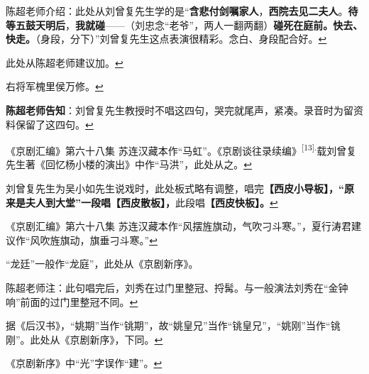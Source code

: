 \item
  \leavevmode\hypertarget{fn126}{}%
  陈超老师介绍：此处从刘曾复先生学的是``\textbf{含悲付剑嘱家人}，\textbf{西院去见二夫人}。\textbf{待等五鼓天明后}，\textbf{我就碰}------（刘忠念``老爷''，两人一翻两翻）\textbf{碰死在庭前。快去、快走。}（身段，分下）''刘曾复先生这点表演很精彩。念白、身段配合好。\protect\hyperlink{fnref126}{↩}
\item
  \leavevmode\hypertarget{fn127}{}%
  此处从陈超老师建议加。\protect\hyperlink{fnref127}{↩}
\item
  \leavevmode\hypertarget{fn128}{}%
  右将军槐里侯万修。\protect\hyperlink{fnref128}{↩}
\item
  \leavevmode\hypertarget{fn129}{}%
  \textbf{陈超老师告知}：刘曾复先生教授时不唱这四句，哭完就尾声，紧凑。录音时为留资料保留了这四句。\protect\hyperlink{fnref129}{↩}
\item
  \leavevmode\hypertarget{fn130}{}%
  《京剧汇编》第六十八集
  苏连汉藏本作``马虹''。《京剧谈往录续编》\textsuperscript{{[}13{]}.}载刘曾复先生著《回忆杨小楼的演出》中作``马洪''，此处从之。\protect\hyperlink{fnref130}{↩}
\item
  \leavevmode\hypertarget{fn131}{}%
  刘曾复先生为吴小如先生说戏时，此处板式略有调整，唱完\textbf{【西皮小导板】，``原来是夫人到大堂''一段唱【西皮散板】，}此段唱\textbf{【西皮快板】。}\protect\hyperlink{fnref131}{↩}
\item
  \leavevmode\hypertarget{fn132}{}%
  《京剧汇编》第六十八集
  苏连汉藏本作``风摆旌旗动，气吹刁斗寒。''，夏行涛君建议作``风吹旌旗动，旗垂刁斗寒。''\protect\hyperlink{fnref132}{↩}
\item
  \leavevmode\hypertarget{fn133}{}%
  ``龙廷''一般作``龙庭''，此处从《京剧新序》。

  陈超老师注：此句唱完后，刘秀在过门里整冠、捋髯。与一般演法刘秀在``金钟响''前面的过门里整冠不同。\protect\hyperlink{fnref133}{↩}
\item
  \leavevmode\hypertarget{fn134}{}%
  据《后汉书》，``姚期''当作``铫期''，故``姚皇兄''当作``铫皇兄''，``姚刚''当作``铫刚''。此处从《京剧新序》，下同。\protect\hyperlink{fnref134}{↩}
\item
  \leavevmode\hypertarget{fn135}{}%
  《京剧新序》中``光''字误作``建''。\protect\hyperlink{fnref135}{↩}
